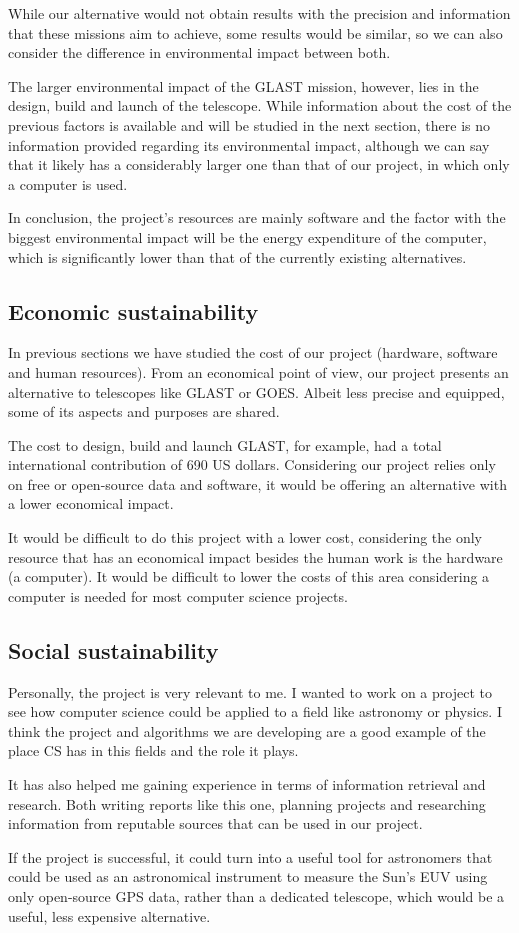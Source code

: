 While our alternative would not obtain results with the precision and information that these missions aim to achieve, some results would be similar, so we can also consider the difference in environmental impact between both.

The larger environmental impact of the GLAST mission, however, lies in the design, build and launch of the telescope. While information about the cost of the previous factors is available and will be studied in the next section, there is no information provided regarding its environmental impact, although we can say that it likely has a considerably larger one than that of our project, in which only a computer is used.

In conclusion, the project’s resources are mainly software and the factor with the biggest environmental impact will be the energy expenditure of the computer, which is significantly lower than that of the currently existing alternatives.

\subsection{Economic sustainability}

In previous sections we have studied the cost of our project (hardware, software and human resources). From an economical point of view, our project presents an alternative to telescopes like GLAST or GOES. Albeit less precise and equipped, some of its aspects and purposes are shared.

The  cost to design, build and launch GLAST, for example, had a total international contribution of 690 US dollars. Considering our project relies only on free or open-source data and software, it would be offering an alternative with a lower economical impact. 

It would be difficult to do this project with a lower cost, considering the only resource that has an economical impact besides the human work is the hardware (a computer). It would be difficult to lower the costs of this area considering a computer is needed for most computer science projects.

\subsection{Social sustainability}

Personally, the project is very relevant to me. I wanted to work on a project to see how computer science could be applied to a field like astronomy or physics. I think the project and algorithms we are developing are a good example of the place CS has in this fields and the role it plays.

It has also helped me gaining experience in terms of information retrieval and research. Both writing reports like this one, planning projects and researching information from reputable sources that can be used in our project.

If the project is successful, it could turn into a useful tool for astronomers that could be used as an astronomical instrument to measure the Sun’s EUV using only open-source GPS data, rather than a dedicated telescope, which would be a useful, less expensive alternative.

